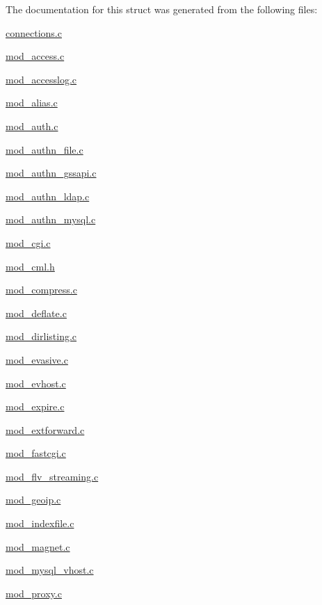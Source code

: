 The documentation for this struct was generated from the following files\-:\begin{DoxyCompactItemize}
\item 
\hyperlink{connections_8c}{connections.\-c}\item 
\hyperlink{mod__access_8c}{mod\-\_\-access.\-c}\item 
\hyperlink{mod__accesslog_8c}{mod\-\_\-accesslog.\-c}\item 
\hyperlink{mod__alias_8c}{mod\-\_\-alias.\-c}\item 
\hyperlink{mod__auth_8c}{mod\-\_\-auth.\-c}\item 
\hyperlink{mod__authn__file_8c}{mod\-\_\-authn\-\_\-file.\-c}\item 
\hyperlink{mod__authn__gssapi_8c}{mod\-\_\-authn\-\_\-gssapi.\-c}\item 
\hyperlink{mod__authn__ldap_8c}{mod\-\_\-authn\-\_\-ldap.\-c}\item 
\hyperlink{mod__authn__mysql_8c}{mod\-\_\-authn\-\_\-mysql.\-c}\item 
\hyperlink{mod__cgi_8c}{mod\-\_\-cgi.\-c}\item 
\hyperlink{mod__cml_8h}{mod\-\_\-cml.\-h}\item 
\hyperlink{mod__compress_8c}{mod\-\_\-compress.\-c}\item 
\hyperlink{mod__deflate_8c}{mod\-\_\-deflate.\-c}\item 
\hyperlink{mod__dirlisting_8c}{mod\-\_\-dirlisting.\-c}\item 
\hyperlink{mod__evasive_8c}{mod\-\_\-evasive.\-c}\item 
\hyperlink{mod__evhost_8c}{mod\-\_\-evhost.\-c}\item 
\hyperlink{mod__expire_8c}{mod\-\_\-expire.\-c}\item 
\hyperlink{mod__extforward_8c}{mod\-\_\-extforward.\-c}\item 
\hyperlink{mod__fastcgi_8c}{mod\-\_\-fastcgi.\-c}\item 
\hyperlink{mod__flv__streaming_8c}{mod\-\_\-flv\-\_\-streaming.\-c}\item 
\hyperlink{mod__geoip_8c}{mod\-\_\-geoip.\-c}\item 
\hyperlink{mod__indexfile_8c}{mod\-\_\-indexfile.\-c}\item 
\hyperlink{mod__magnet_8c}{mod\-\_\-magnet.\-c}\item 
\hyperlink{mod__mysql__vhost_8c}{mod\-\_\-mysql\-\_\-vhost.\-c}\item 
\hyperlink{mod__proxy_8c}{mod\-\_\-proxy.\-c}\item 

\end{DoxyCompactItemize}
